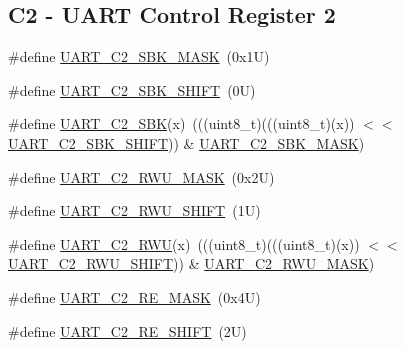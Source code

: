 \subsection*{C2 -\/ U\+A\+RT Control Register 2}
\begin{DoxyCompactItemize}
\item 
\#define \mbox{\hyperlink{group___u_a_r_t___register___masks_ga8d243e5b3a3ece12bdeca818bacb15ee}{U\+A\+R\+T\+\_\+\+C2\+\_\+\+S\+B\+K\+\_\+\+M\+A\+SK}}~(0x1\+U)
\item 
\#define \mbox{\hyperlink{group___u_a_r_t___register___masks_ga94f62ff8a45a08ae54b40da725fb245b}{U\+A\+R\+T\+\_\+\+C2\+\_\+\+S\+B\+K\+\_\+\+S\+H\+I\+FT}}~(0\+U)
\item 
\#define \mbox{\hyperlink{group___u_a_r_t___register___masks_ga5d861d856f5540b2349706263333089b}{U\+A\+R\+T\+\_\+\+C2\+\_\+\+S\+BK}}(x)~(((uint8\+\_\+t)(((uint8\+\_\+t)(x)) $<$$<$ \mbox{\hyperlink{group___u_a_r_t___register___masks_ga94f62ff8a45a08ae54b40da725fb245b}{U\+A\+R\+T\+\_\+\+C2\+\_\+\+S\+B\+K\+\_\+\+S\+H\+I\+FT}})) \& \mbox{\hyperlink{group___u_a_r_t___register___masks_ga8d243e5b3a3ece12bdeca818bacb15ee}{U\+A\+R\+T\+\_\+\+C2\+\_\+\+S\+B\+K\+\_\+\+M\+A\+SK}})
\item 
\#define \mbox{\hyperlink{group___u_a_r_t___register___masks_ga279868a42acca3c1eeba8c53bb94b208}{U\+A\+R\+T\+\_\+\+C2\+\_\+\+R\+W\+U\+\_\+\+M\+A\+SK}}~(0x2\+U)
\item 
\#define \mbox{\hyperlink{group___u_a_r_t___register___masks_gaa163993d547a96c2ea002ff52e6b0971}{U\+A\+R\+T\+\_\+\+C2\+\_\+\+R\+W\+U\+\_\+\+S\+H\+I\+FT}}~(1\+U)
\item 
\#define \mbox{\hyperlink{group___u_a_r_t___register___masks_gadbfac0194fbb2ff77f387fc784c43db9}{U\+A\+R\+T\+\_\+\+C2\+\_\+\+R\+WU}}(x)~(((uint8\+\_\+t)(((uint8\+\_\+t)(x)) $<$$<$ \mbox{\hyperlink{group___u_a_r_t___register___masks_gaa163993d547a96c2ea002ff52e6b0971}{U\+A\+R\+T\+\_\+\+C2\+\_\+\+R\+W\+U\+\_\+\+S\+H\+I\+FT}})) \& \mbox{\hyperlink{group___u_a_r_t___register___masks_ga279868a42acca3c1eeba8c53bb94b208}{U\+A\+R\+T\+\_\+\+C2\+\_\+\+R\+W\+U\+\_\+\+M\+A\+SK}})
\item 
\#define \mbox{\hyperlink{group___u_a_r_t___register___masks_ga181a8e8fd0f780d45f1bff7c76836fe5}{U\+A\+R\+T\+\_\+\+C2\+\_\+\+R\+E\+\_\+\+M\+A\+SK}}~(0x4\+U)
\item 
\#define \mbox{\hyperlink{group___u_a_r_t___register___masks_ga65bf907ff7aaa0afeb5a3c34ff3a4b2c}{U\+A\+R\+T\+\_\+\+C2\+\_\+\+R\+E\+\_\+\+S\+H\+I\+FT}}~(2\+U)
\item 

\end{DoxyCompactItemize}
